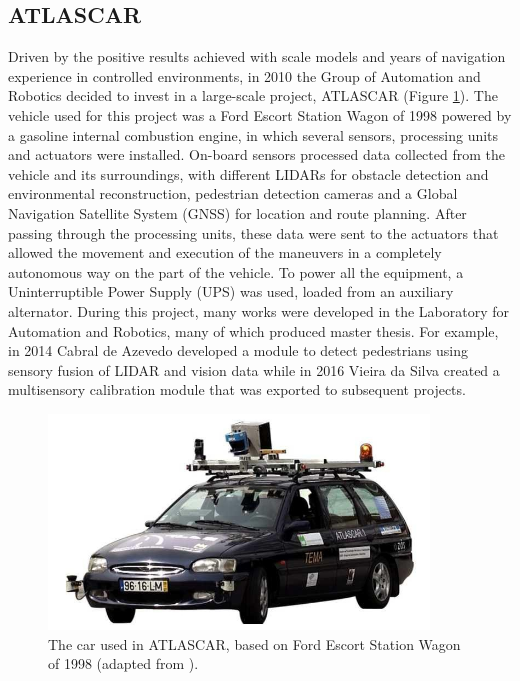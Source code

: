 \subsection{ATLASCAR}\label{sec:ATLASCAR}
Driven by the positive results achieved with scale models and years of navigation experience in controlled environments, in 2010 the Group of Automation and Robotics decided to invest in a large-scale project, ATLASCAR (Figure \ref{fig:atlascar1}). The vehicle used for this project was a Ford Escort Station Wagon of 1998 powered by a gasoline internal combustion engine, in which several sensors, processing units and actuators were installed. On-board sensors processed data collected from the vehicle and its surroundings, with different LIDARs for obstacle detection and environmental reconstruction, pedestrian detection cameras and a Global Navigation Satellite System (GNSS) for location and route planning. After passing through the processing units, these data were sent to the actuators that allowed the movement and execution of the maneuvers in a completely autonomous way on the part of the vehicle. To power all the equipment, a Uninterruptible Power Supply (UPS) was used, loaded from an auxiliary alternator. During this project, many works were developed in the Laboratory for Automation and Robotics, many of which produced master thesis. For example, in 2014 Cabral de Azevedo \cite{Azevedo2014} developed a module to detect pedestrians using sensory fusion of LIDAR and vision data while in 2016 Vieira da Silva \cite{Silva2016} created a multisensory calibration module that was exported to subsequent projects.
\begin{figure}[!h]
	\centering
	\includegraphics[width=0.9\textwidth]{./figure/atlascar1.jpg}
	\caption{The car used in ATLASCAR, based on Ford Escort Station Wagon of 1998 (adapted from \cite{Pereira2012}).}
	\label{fig:atlascar1}
\end{figure}

